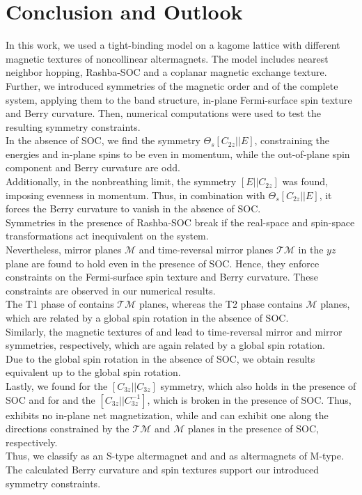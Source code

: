\chapter{Conclusion and Outlook}
\label{chapter: conclusion}

In this work, we used a tight-binding model on a kagome lattice with different magnetic textures of noncollinear altermagnets. The model includes nearest neighbor hopping, Rashba-SOC and a coplanar magnetic exchange texture.\\
Further, we introduced symmetries of the magnetic order and of the complete system, applying them to the band structure, in-plane Fermi-surface spin texture and Berry curvature. Then, numerical computations were used to test the resulting symmetry constraints.\\

In the absence of SOC, we find the symmetry $\Theta_s[C_{2z}||E]$, constraining the energies and in-plane spins to be even in momentum, while the out-of-plane spin component and Berry curvature are odd.\\
Additionally, in the nonbreathing limit, the symmetry $[E||C_{2z}]$ was found, imposing evenness in momentum. Thus, in combination with $\Theta_s[C_{2z}||E]$, it forces the Berry curvature to vanish in the absence of SOC.\\
Symmetries in the presence of Rashba-SOC break if the real-space and spin-space transformations act inequivalent on the system.\\
Nevertheless, mirror planes $\mathcal{M}$ and time-reversal mirror planes $\mathcal{TM}$ in the $yz$ plane are found to hold even in the presence of SOC. Hence, they enforce constraints on the Fermi-surface spin texture and Berry curvature. These constraints are observed in our numerical results.\\
The T1 phase of  contains $\mathcal{TM}$ planes, whereas the T2 phase contains $\mathcal{M}$ planes, which are related by a global spin rotation in the absence of SOC.\\
Similarly, the magnetic textures of  and  lead to time-reversal mirror and mirror symmetries, respectively, which are again related by a global spin rotation. \\
Due to the global spin rotation in the absence of SOC, we obtain results equivalent up to the global spin rotation.\\
Lastly, we found for  the $[C_{3z}||C_{3z}]$ symmetry, which also holds in the presence of SOC and for  and  the $[C_{3z}||C_{3z}^{-1}]$, which is broken in the presence of SOC. Thus,  exhibits no in-plane net magnetization, while  and  can exhibit one along the directions constrained by the $\mathcal{TM}$ and $\mathcal{M}$ planes in the presence of SOC, respectively.\\
Thus, we classify  as an S-type altermagnet and  and  as altermagnets of M-type.\\
The calculated Berry curvature and spin textures support our introduced symmetry constraints.\\

